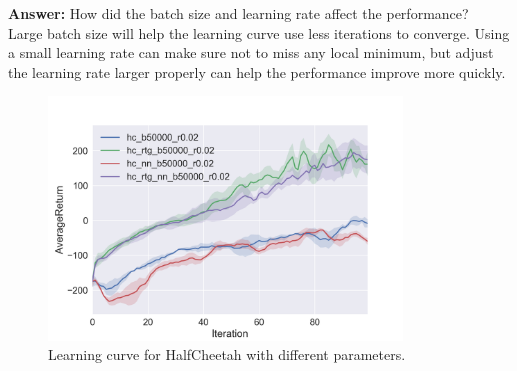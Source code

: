 \documentclass[12pt]{article}
\begin{document}
\textbf{Answer:} How did the batch size and learning rate affect the performance? \\
Large batch size will help the learning curve use less iterations to converge. Using a small learning rate can make sure not to miss any local minimum, but adjust the learning rate larger properly can help the performance improve more quickly.

\begin{figure}[!h]
\centering
\includegraphics[width=3.7in]{Figure_5.png}
\caption{Learning curve for HalfCheetah with different parameters.}
\end{figure}
\end{document}
